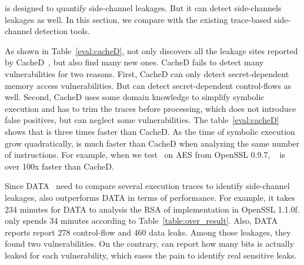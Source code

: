 
\tool{} is designed to quantify side-channel leakages. But it can detect
side-channels leakages as well. In this section, we compare \tool{} with the
existing trace-based side-channel detection tools.

As shown in Table~\ref{eval:cacheD},
\tool{} not only discovers all the leakage sites reported by CacheD~\cite{203878}, but also
find many new ones. CacheD fails to detect many vulnerabilities for two
reasons. First, CacheD can only detect secret-dependent memory access
vulnerabilities. But \tool{} can detect secret-dependent control-flows as well.
Second, CacheD uses some domain
knowledge to simplify symbolic execution and has to trim the traces before
processing, which does not introduce false positives, but can neglect some
vulnerabilities. The table~\ref{eval:cacheD} shows that
\tool{} is three times faster than CacheD. As the time of symbolic execution
grow quadratically, \tool{} is much faster than CacheD when analyzing the same
number of instructions. For example, when we test~\tool{} on AES from OpenSSL
0.9.7, ~\tool{} is over %
100x faster than CacheD.

Since DATA~\cite{217537} need to compare several execution traces to identify
side-channel leakages, \tool{} also outperforms DATA in terms of performance.
For example, it takes 234 minutes for DATA to analysis the RSA of implementation
in OpenSSL 1.1.0f. \tool{} only spends 34 minutes according to Table~\ref{table:over_result}.
Also, DATA reports report 278 control-flow and 460 data leaks. Among those leakages,
they found two vulnerabilities. On the contrary, \tool{} can report how many bits is
actually leaked for each vulnerability, which eases the pain to identify real sensitive leaks.


